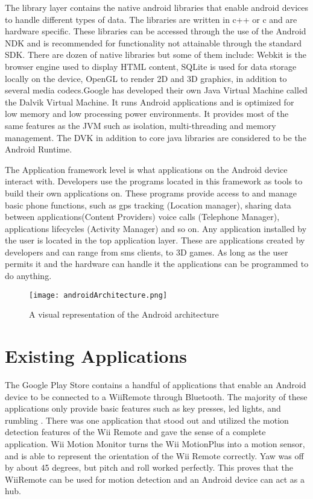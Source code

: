 The library layer contains the native android libraries that enable android devices to handle different types of data. The libraries are written in c++ or c and are hardware specific. These libraries can be accessed through the use of the Android NDK and is recommended for functionality not attainable through the standard SDK. There are dozen of native libraries but some of them include: Webkit is the browser engine used to display HTML content, SQLite is used for data storage locally on the device, OpenGL to render 2D and 3D graphics, in addition to several media codecs.Google has developed their own Java Virtual Machine called the Dalvik Virtual Machine. It runs Android applications and is optimized for low memory and low processing power environments. It provides most of the same features as the JVM such as isolation, multi-threading and memory management. The DVK in addition to core java libraries are considered to be the Android Runtime.

The Application framework level is what applications on the Android device interact with. Developers use the programs located in this framework as tools to build their own applications on. These programs provide access to and manage basic phone functions, such as gps tracking (Location manager), sharing data between applications(Content Providers) voice calls (Telephone Manager), applications lifecycles (Activity Manager) and so on. Any application installed by the user is located in the top application layer. These are applications created by developers and can range from sms clients, to 3D games. As long as the user permits it and the hardware can handle it the applications can be programmed to do anything.


\begin{figure}[!h]
  \centering
    \texttt{[image: androidArchitecture.png]}
    \caption{\footnotesize A visual representation of the Android architecture}
\end{figure}

\section{Existing Applications}
The Google Play Store contains a handful of applications that enable an Android device to be connected to a WiiRemote through Bluetooth. The majority of these applications only provide basic features such as key presses, led lights, and rumbling \cite{wiimoteController, simpleWiiController}. There was one application that stood out and utilized the motion detection features of the Wii Remote and gave the sense of a complete application. Wii Motion Monitor \cite{wiiMotionMonitor} turns the Wii MotionPlus into a motion sensor, and is able to represent the orientation of the Wii Remote correctly. Yaw was off by about 45 degrees, but pitch and roll worked perfectly. This proves that the WiiRemote can be used for motion detection and an Android device can act as a hub.

